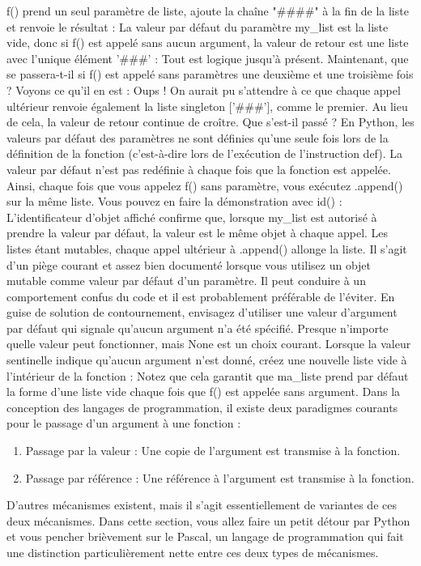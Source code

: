 f() prend un seul paramètre de liste, ajoute la chaîne "####" à la fin de la liste et renvoie le résultat :
La valeur par défaut du paramètre my_list est la liste vide, donc si f() est appelé sans aucun argument, la valeur de retour est une liste avec l'unique élément '###' :
Tout est logique jusqu'à présent.  Maintenant, que se passera-t-il si f() est appelé sans paramètres une deuxième et une troisième fois ?  Voyons ce qu'il en est :
Oups !  On aurait pu s'attendre à ce que chaque appel ultérieur renvoie également la liste singleton ['###'], comme le premier.  Au lieu de cela, la valeur de retour continue de croître.  Que s'est-il passé ?
En Python, les valeurs par défaut des paramètres ne sont définies qu'une seule fois lors de la définition de la fonction (c'est-à-dire lors de l'exécution de l'instruction def).  La valeur par défaut n'est pas redéfinie à chaque fois que la fonction est appelée.  Ainsi, chaque fois que vous appelez f() sans paramètre, vous exécutez .append() sur la même liste.
Vous pouvez en faire la démonstration avec id() :
L'identificateur d'objet affiché confirme que, lorsque my_list est autorisé à prendre la valeur par défaut, la valeur est le même objet à chaque appel.  Les listes étant mutables, chaque appel ultérieur à .append() allonge la liste. Il s'agit d'un piège courant et assez bien documenté lorsque vous utilisez un objet mutable comme valeur par défaut d'un paramètre.  Il peut conduire à un comportement confus du code et il est probablement préférable de l'éviter.
En guise de solution de contournement, envisagez d'utiliser une valeur d'argument par défaut qui signale qu'aucun argument n'a été spécifié.  Presque n'importe quelle valeur peut fonctionner, mais None est un choix courant.  Lorsque la valeur sentinelle indique qu'aucun argument n'est donné, créez une nouvelle liste vide à l'intérieur de la fonction :
Notez que cela garantit que ma_liste prend par défaut la forme d'une liste vide chaque fois que f() est appelée sans argument.
Dans la conception des langages de programmation, il existe deux paradigmes courants pour le passage d'un argument à une fonction :
\begin{enumerate}
\item Passage par la valeur : Une copie de l'argument est transmise à la fonction.
\item Passage par référence : Une référence à l'argument est transmise à la fonction.
\end{enumerate}
D'autres mécanismes existent, mais il s'agit essentiellement de variantes de ces deux mécanismes. Dans cette section, vous allez faire un petit détour par Python et vous pencher brièvement sur le Pascal, un langage de programmation qui fait une distinction particulièrement nette entre ces deux types de mécanismes.
